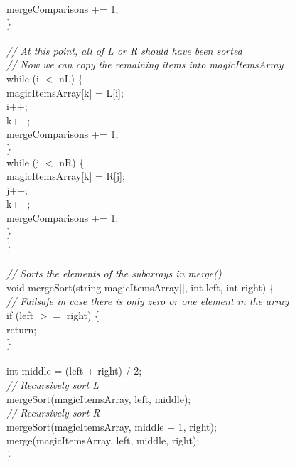 \documentclass{article}
\begin{document}
\begin {linenumbers}
{        \indent \indent mergeComparisons += 1;\\
    \indent \}\\
\\
    \textit{\indent // At this point, all of L or R should have been sorted\\
    \indent // Now we can copy the remaining items into magicItemsArray\\}
    \indent while (i $<$ nL) \{\\
        \indent \indent magicItemsArray[k] = L[i];\\
        \indent \indent i++;\\
        \indent \indent k++;\\
        \indent \indent mergeComparisons += 1;\\
    \indent \}\\
    \indent while (j $<$ nR) \{\\
        \indent \indent magicItemsArray[k] = R[j];\\
        \indent \indent j++;\\
        \indent \indent k++;\\
        \indent \indent mergeComparisons += 1;\\
    \indent \}\\
\}\\
\\
\textit{// Sorts the elements of the subarrays in merge()\\}
void mergeSort(string magicItemsArray[], int left, int right) \{\\
    \textit{\indent // Failsafe in case there is only zero or one element in the array\\}
    \indent if (left $>=$ right) \{\\
        \indent \indent return;\\
    \indent \}\\
\\
    \indent int middle = (left + right) / 2;\\
    \textit{\indent // Recursively sort L\\}
    \indent mergeSort(magicItemsArray, left, middle);\\
    \textit{\indent // Recursively sort R\\}
    \indent mergeSort(magicItemsArray, middle + 1, right);\\
    \indent merge(magicItemsArray, left, middle, right);\\
\}\\
}
\end{linenumbers}
\end{document}
